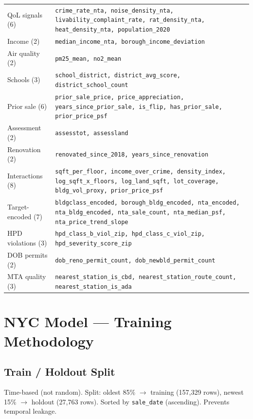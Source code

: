 \documentclass[11pt, a4paper, twoside]{report}
\begin{document}
\begin{longtable}{lp{10cm}}
  QoL signals (6)     & \texttt{crime\_rate\_nta, noise\_density\_nta, livability\_complaint\_rate, rat\_density\_nta, heat\_density\_nta, population\_2020} \\
  Income (2)          & \texttt{median\_income\_nta, borough\_income\_deviation} \\
  Air quality (2)     & \texttt{pm25\_mean, no2\_mean} \\
  Schools (3)         & \texttt{school\_district, district\_avg\_score, district\_school\_count} \\
  Prior sale (6)      & \texttt{prior\_sale\_price, price\_appreciation, years\_since\_prior\_sale, is\_flip, has\_prior\_sale, prior\_price\_psf} \\
  Assessment (2)      & \texttt{assesstot, assessland} \\
  Renovation (2)      & \texttt{renovated\_since\_2018, years\_since\_renovation} \\
  Interactions (8)    & \texttt{sqft\_per\_floor, income\_over\_crime, density\_index, log\_sqft\_x\_floors, log\_land\_sqft, lot\_coverage, bldg\_vol\_proxy, prior\_price\_psf} \\
  Target-encoded (7)  & \texttt{bldgclass\_encoded, borough\_bldg\_encoded, nta\_encoded, nta\_bldg\_encoded, nta\_sale\_count, nta\_median\_psf, nta\_price\_trend\_slope} \\
  HPD violations (3)  & \texttt{hpd\_class\_b\_viol\_zip, hpd\_class\_c\_viol\_zip, hpd\_severity\_score\_zip} \\
  DOB permits (2)     & \texttt{dob\_reno\_permit\_count, dob\_newbld\_permit\_count} \\
  MTA quality (3)     & \texttt{nearest\_station\_is\_cbd, nearest\_station\_route\_count, nearest\_station\_is\_ada} \\
\end{longtable}

\chapter{NYC Model --- Training Methodology}
\label{ch:nyc_training}

\section{Train / Holdout Split}
Time-based (not random). Split: oldest 85\% $\to$ training (157,329 rows),
newest 15\% $\to$ holdout (27,763 rows). Sorted by \texttt{sale\_date}
(ascending). Prevents temporal leakage.
\end{document}
